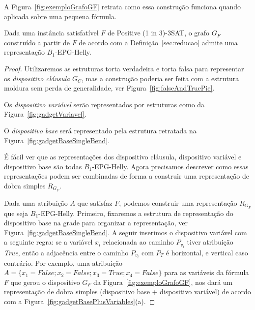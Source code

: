 A Figura~\ref{fig:exemploGrafoGF} retrata como essa construção funciona quando aplicada sobre uma pequena fórmula. %





\begin{lema}\label{lem:ida}
Dada uma instância satisfatível $F$ de {\sc Positive (1 in 3)-3SAT}, o grafo  $G_F$ construído a partir de $F$ de acordo com a Definição~\ref{sec:reducao} admite uma representação $B_{1}$-EPG-Helly.
\end{lema}


\begin{proof}

Utilizaremos as estruturas  torta verdadeira e torta falsa para representar os  \textit{dispositivo cláusula} $ G_C$, mas a construção poderia ser feita com a estrutura moldura sem perda de generalidade, ver Figura~\ref{fig:falseAndTruePie}.  




Os \textit{dispositivo variável} serão representados por estruturas como da Figura~\ref{fig:gadgetVariavel}.




O \textit{dispositivo base} será representado pela estrutura retratada na  Figura~\ref{fig:gadgetBaseSingleBend}.



É fácil ver que as representações dos dispositivo cláusula, dispositivo variável e dispositivo base são todas  $B_1$-EPG-Helly. Agora precisamos descrever como essas representações podem ser combinadas de forma a construir uma representação  de dobra simples $R_{G_F}$.

Dada uma atribuição  $A$ que satisfaz  $F$, podemos construir uma representação $R_{G_F}$ que seja  $B_{1}$-EPG-Helly. Primeiro, fixaremos a estrutura de representação do dispositivo base na grade para organizar a representação, ver Figura~\ref{fig:gadgetBaseSingleBend}. A seguir inserimos o  dispositivo variável com a seguinte regra: se a variável $x_i$ relacionada ao caminho   $P_{v_i}$ tiver atribuição  \textit{True}, então a adjacência entre o caminho $P_{v_i}$ com $P_{T}$ é horizontal, e vertical caso contrário. Por exemplo, uma atribuição  $A=\{x_1=False; x_2=False;x_3=True; x_4=False\}$  para as variáveis da fórmula  $F$ que gerou o dispositivo $G_F$ da Figura~\ref{fig:exemploGrafoGF}, nos dará um representação de dobra simples (dispositivo base + dispositivo variável) de acordo com a  Figura~\ref{fig:gadgetBasePlusVariables}(a). 


\end{proof}

